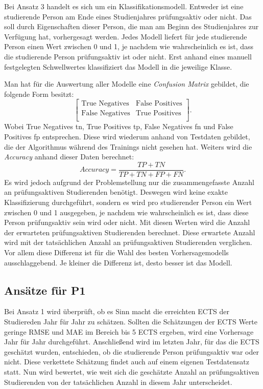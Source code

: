 Bei Ansatz 3 handelt es sich um ein Klassifikationsmodell. Entweder ist eine studierende Person am Ende eines Studienjahres pr\"ufungsaktiv oder nicht. Das soll
durch Eigenschaften dieser Person, die man am Beginn des Studienjahres zur Verf\"ugung hat, vorhergesagt werden. Jedes Modell liefert f\"ur jede studierende Person
einen Wert zwischen 0 und 1, je nachdem wie wahrscheinlich es ist, dass die studierende Person pr\"ufungsaktiv ist oder nicht. Erst anhand eines manuell festgelegten
Schwellwertes klassifiziert das Modell in die jeweilige Klasse.

Man hat f\"ur die Auswertung aller Modelle eine \textit{Confusion Matrix} gebildet, die folgende Form besitzt:
$$ \left[ \begin{array}{rr} \text{True Negatives} & \text{False Positives}  \\  \text{False Negatives} & \text{True Positives} \\  \end{array}\right] .$$
Wobei True Negatives \gls{tn}, True Positives \gls{tp}, False Negatives \gls{fn} und False Positives \gls{fp} entsprechen.
Diese wird wiederum anhand von Testdaten gebildet, die der Algorithmus w\"ahrend des Trainings nicht gesehen hat. Weiters wird die \textit{Accuracy} anhand dieser Daten berechnet:
$$ Accuracy = \frac{TP + TN}{TP + TN + FP + FN}.$$
Es wird jedoch aufgrund der Problemstellung nur die zusammengefasste Anzahl an pr\"ufungsaktiven Studierenden ben\"otigt. Deswegen wird keine exakte Klassifizierung durchgef\"uhrt,
sondern es wird pro studierender Person ein Wert zwischen 0 und 1 ausgegeben, je nachdem wie wahrscheinlich es ist, dass diese Person pr\"ufungsaktiv sein wird oder nicht.
Mit diesen Werten wird die Anzahl der erwarteten pr\"ufungsaktiven Studierenden berechnet.
Diese erwartete Anzahl wird mit der tats\"achlichen Anzahl an pr\"ufungsaktiven Studierenden verglichen.
Vor allem diese Differenz ist f\"ur die Wahl des besten Vorhersagemodells ausschlaggebend. Je kleiner die Differenz ist, desto besser ist das Modell.

\subsection{Ans\"atze f\"ur P1}
Bei Ansatz 1 wird \"uberpr\"uft, ob es Sinn macht die erreichten ECTS der Studiereden Jahr f\"ur Jahr zu sch\"atzen. Sollten die Sch\"atzungen der
ECTS Werte geringe RMSE und MAE im Bereich bis 5 ECTS ergeben, wird eine Vorhersage Jahr f\"ur Jahr durchgef\"uhrt.
Anschlie{\ss}end wird im letzten Jahr, f\"ur das die ECTS gesch\"atzt wurden, entschieden, ob die studierende Person pr\"ufungsaktiv war oder nicht.
Diese verkettete Sch\"atzung findet auch auf einem eigenen Testdatensatz statt. Nun wird bewertet, wie weit sich die gesch\"atzte Anzahl an pr\"ufungsaktiven
Studierenden von der tats\"achlichen Anzahl in diesem Jahr unterscheidet.

